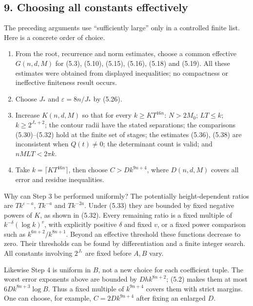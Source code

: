 \documentclass[
  11pt,
  a4paper,
]{article}
\providecommand{\tightlist}{%
  \setlength{\itemsep}{0pt}\setlength{\parskip}{0pt}}
\begin{document}
\subsection{9. Choosing all constants
effectively}\label{choosing-all-constants-effectively}

The preceding arguments use ``sufficiently large'' only in a controlled
finite list. Here is a concrete order of choice.

\begin{enumerate}
\def\labelenumi{\arabic{enumi}.}
\tightlist
\item
  From the root, recurrence and norm estimates, choose a common
  effective \(G(n,d,M)\) for (5.3), (5.10), (5.15), (5.16), (5.18) and
  (5.19). All these estimates were obtained from displayed inequalities;
  no compactness or ineffective finiteness result occurs.
\item
  Choose \(J_*\) and \(\varepsilon=8n/J_*\) by (5.26).
\item
  Increase \(K(n,d,M)\) so that for every \(k\ge KT^{16n}\): \(N>2M_0\);
  \(LT\le k\); \(k\ge2^{J_*+2}\); the contour radii have the stated
  separations; the comparisons (5.30)--(5.32) hold at the finite set of
  stages; the estimates (5.36), (5.38) are inconsistent when
  \(Q(t)\ne0\); the determinant count is valid; and \(nMLT<2\pi k\).
\item
  Take \(k=\lceil KT^{16n}\rceil\), then choose \(C>Dk^{9n+4}\), where
  \(D(n,d,M)\) covers all error and residue inequalities.
\end{enumerate}

Why can Step 3 be performed uniformly? The potentially height-dependent
ratios are \(Tk^{\varepsilon-a}\), \(Tk^{-a}\) and \(Tk^{-2a}\). Under
(5.33) they are bounded by fixed negative powers of \(K\), as shown in
(5.32). Every remaining ratio is a fixed multiple of
\(k^{-\delta}(\log k)^v\), with explicitly positive \(\delta\) and fixed
\(v\), or a fixed power comparison such as \(k^{6n+2}/k^{8n+1}\). Beyond
an effective threshold these functions decrease to zero. Their
thresholds can be found by differentiation and a finite integer search.
All constants involving \(2^{J_*}\) are fixed before \(A,B\) vary.

Likewise Step 4 is uniform in \(B\), not a new choice for each
coefficient tuple. The worst error exponents above are bounded by
\(Dhk^{8n+2}\); (5.2) makes them at most \(6Dk^{8n+3}\log B\). Thus a
fixed multiple of \(k^{9n+4}\) covers them with strict margins. One can
choose, for example, \(C=2Dk^{9n+4}\) after fixing an enlarged \(D\).
\end{document}
